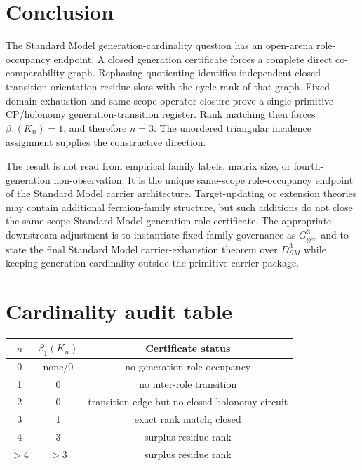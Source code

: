 \documentclass[11pt]{article}
\newcommand{\DSMthree}{D_{SM}^{3}}
\newcommand{\GgenThree}{G_{\mathrm{gen}}^{3}}
\theoremstyle{definition}
\theoremstyle{plain}
\theoremstyle{remark}
\begin{document}
\section{Conclusion}

The Standard Model generation-cardinality question has an open-arena role-occupancy endpoint. A closed generation certificate forces a complete direct co-comparability graph. Rephasing quotienting identifies independent closed transition-orientation residue slots with the cycle rank of that graph. Fixed-domain exhaustion and same-scope operator closure prove a single primitive CP/holonomy generation-transition register. Rank matching then forces \(\beta_1(K_n)=1\), and therefore \(n=3\). The unordered triangular incidence assignment supplies the constructive direction.

The result is not read from empirical family labels, matrix size, or fourth-generation non-observation. It is the unique same-scope role-occupancy endpoint of the Standard Model carrier architecture. Target-updating or extension theories may contain additional fermion-family structure, but such additions do not close the same-scope Standard Model generation-role certificate. The appropriate downstream adjustment is to instantiate fixed family governance as \(\GgenThree\) and to state the final Standard Model carrier-exhaustion theorem over \(\DSMthree\) while keeping generation cardinality outside the primitive carrier package.

\appendix
\section{Cardinality audit table}
\begin{longtable}{ccc}
\toprule
\(n\) & \(\beta_1(K_n)\) & Certificate status\\
\midrule
0 & none/0 & no generation-role occupancy\\
1 & 0 & no inter-role transition\\
2 & 0 & transition edge but no closed holonomy circuit\\
3 & 1 & exact rank match; closed\\
4 & 3 & surplus residue rank\\
\(>4\) & \(>3\) & surplus residue rank\\
\bottomrule
\end{longtable}
\end{document}
